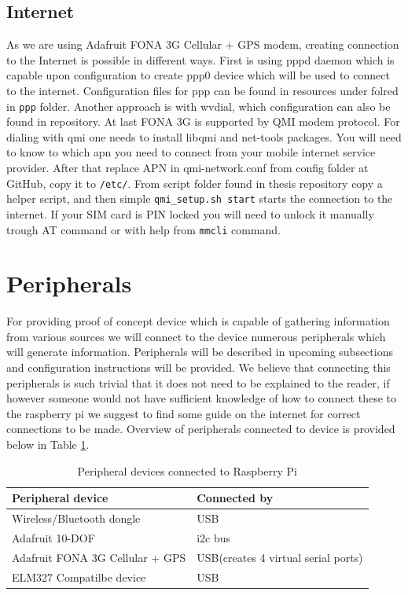 \subsection{Internet} %
\label{sub:internet}
As we are using Adafruit FONA 3G Cellular + GPS modem, creating connection to the Internet is possible in different ways. First is using pppd daemon which is capable upon configuration to create ppp0 device which will be used to connect to the internet. Configuration files for ppp can be found in resources under folred in \verb|ppp| folder. Another approach is with wvdial, which configuration can also be found in repository. At last FONA 3G is supported by QMI modem protocol. For dialing with qmi one needs to install libqmi and net-tools packages. You will need to know to which apn you need to connect from your mobile internet service provider. After that replace APN in qmi-network.conf from config folder at GitHub, copy it to \verb|/etc/|. From script folder found in thesis repository copy a helper script, and then simple \verb|qmi_setup.sh start| starts the connection to the internet. If your SIM card is PIN locked you will need to unlock it manually trough AT command or with help from \verb|mmcli| command.
\newpage
\section{Peripherals} %
\label{sec:peripherals}
For providing proof of concept device which is capable of gathering information from various sources we will connect to the device numerous peripherals which will generate information.  Peripherals will be described in upcoming subsections and configuration instructions will be provided. We believe that connecting this peripherals is such trivial that it does not need to be explained to the reader, if however someone would not have sufficient knowledge of how to connect these to the raspberry pi we suggest to find some guide on the internet for correct connections to be made. Overview of peripherals connected to device is provided below in Table \ref{tab:tab2}.
\begin{table}[H]
 \begin{center}
   \begin{tabular}{l l}
   Peripheral device & Connected by\\
   \hline
   	Wireless/Bluetooth dongle & USB\\
	Adafruit 10-DOF & \gls{i2c} bus\\
	Adafruit FONA 3G Cellular + GPS & USB(creates 4 virtual serial ports)\\
	ELM327 Compatilbe device & USB\\
   \hline
   \end{tabular}
 \end{center}
 \caption{Peripheral devices connected to Raspberry Pi}
 \label{tab:tab2}
\end{table}
